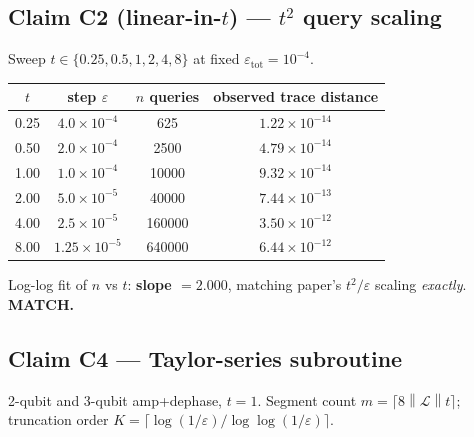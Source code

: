 \documentclass[11pt]{article}
\newcommand{\opnorm}[1]{\left\lVert #1 \right\rVert}
\begin{document}
\subsection{Claim C2 (linear-in-$t$) --- $t^2$ query scaling}

Sweep $t \in \{0.25, 0.5, 1, 2, 4, 8\}$ at fixed $\varepsilon_{\text{tot}} = 10^{-4}$.

\begin{center}
\begin{tabular}{cccc}
\toprule
$t$ & step $\varepsilon$ & $n$ queries & observed trace distance \\
\midrule
0.25 & $4.0{\times}10^{-4}$ & 625     & $1.22{\times}10^{-14}$ \\
0.50 & $2.0{\times}10^{-4}$ & 2500    & $4.79{\times}10^{-14}$ \\
1.00 & $1.0{\times}10^{-4}$ & 10000   & $9.32{\times}10^{-14}$ \\
2.00 & $5.0{\times}10^{-5}$ & 40000   & $7.44{\times}10^{-13}$ \\
4.00 & $2.5{\times}10^{-5}$ & 160000  & $3.50{\times}10^{-12}$ \\
8.00 & $1.25{\times}10^{-5}$& 640000  & $6.44{\times}10^{-12}$ \\
\bottomrule
\end{tabular}
\end{center}
Log-log fit of $n$ vs $t$: \textbf{slope $= 2.000$}, matching paper's $t^2/\varepsilon$ scaling \emph{exactly}. \textbf{MATCH.}

\subsection{Claim C4 --- Taylor-series subroutine}

2-qubit and 3-qubit amp+dephase, $t = 1$. Segment count $m = \lceil 8 \opnorm{\mathcal{L}} t \rceil$; truncation order $K = \lceil \log(1/\varepsilon)/\log\log(1/\varepsilon)\rceil$.
\end{document}
